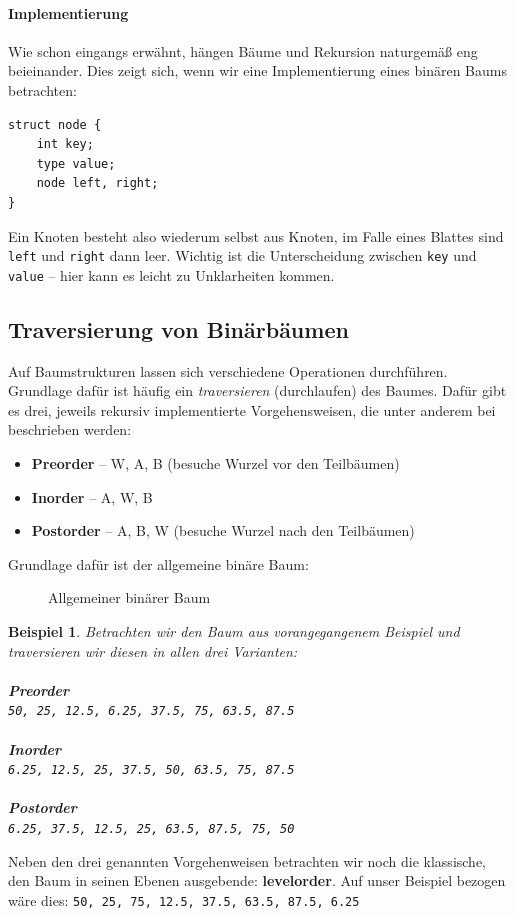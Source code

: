 \documentclass[11pt,a4paper]{scrartcl}
\newtheorem{example}{Beispiel}
\begin{document}
\paragraph{Implementierung}
Wie schon eingangs erwähnt, hängen Bäume und Rekursion naturgemäß eng beieinander. Dies zeigt sich, wenn wir eine Implementierung eines binären Baums betrachten:
\begin{lstlisting}
struct node {
	int key;
	type value;
	node left, right;
}
\end{lstlisting}
Ein Knoten besteht also wiederum selbst aus Knoten, im Falle eines Blattes sind \texttt{left} und \texttt{right} dann leer. Wichtig ist die Unterscheidung zwischen \texttt{key} und \texttt{value} -- hier kann es leicht zu Unklarheiten kommen.
\subsection{Traversierung von Binärbäumen}
Auf Baumstrukturen lassen sich verschiedene Operationen durchführen. Grundlage dafür ist häufig ein \textit{traversieren} ({\glqq}durchlaufen{\grqq}) des Baumes. Dafür gibt es drei, jeweils rekursiv implementierte Vorgehensweisen, die unter anderem bei \parencite{Wirth} beschrieben werden: 
\begin{itemize}
\item \textbf{Preorder} -- W, A, B (besuche Wurzel vor den Teilbäumen)
\item \textbf{Inorder} -- A, W, B 
\item \textbf{Postorder} -- A, B, W (besuche Wurzel nach den Teilbäumen)
\end{itemize}
Grundlage dafür ist der allgemeine binäre Baum:
\begin{figure}[h]
\centering
{}
\caption{Allgemeiner binärer Baum}
\end{figure}
\begin{example}
Betrachten wir den Baum aus vorangegangenem Beispiel und traversieren wir diesen in allen drei Varianten: \\\\
\textbf{Preorder} \\
\texttt{50, 25, 12.5, 6.25, 37.5, 75, 63.5, 87.5} \\\\
\textbf{Inorder} \\
\texttt{6.25, 12.5, 25, 37.5, 50, 63.5, 75, 87.5} \\\\
\textbf{Postorder} \\
\texttt{6.25, 37.5, 12.5, 25, 63.5, 87.5, 75, 50}
\end{example}
Neben den drei genannten Vorgehenweisen betrachten wir noch die klassische, den Baum in seinen Ebenen ausgebende: \textbf{levelorder}. Auf unser Beispiel bezogen wäre dies:
\texttt{50, 25, 75, 12.5, 37.5, 63.5, 87.5, 6.25}
\end{document}
